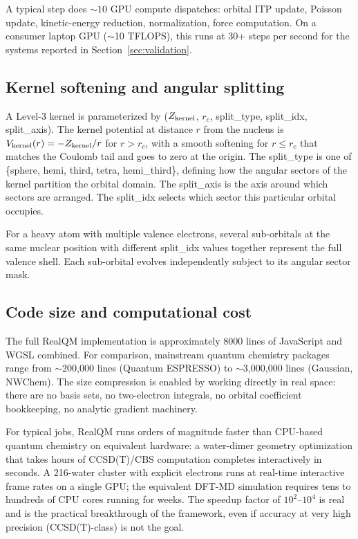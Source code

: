 \documentclass[11pt]{article}
\begin{document}
A typical step does ${\sim}10$ GPU compute dispatches: orbital ITP update, Poisson update, kinetic-energy reduction, normalization, force computation. On a consumer laptop GPU ($\sim$10 TFLOPS), this runs at 30+ steps per second for the systems reported in Section~\ref{sec:validation}.

\subsection{Kernel softening and angular splitting}

A Level-3 kernel is parameterized by ($Z_{\rm kernel}$, $r_c$, split\_type, split\_idx, split\_axis). The kernel potential at distance $r$ from the nucleus is $V_{\rm kernel}(r) = -Z_{\rm kernel}/r$ for $r > r_c$, with a smooth softening for $r \leq r_c$ that matches the Coulomb tail and goes to zero at the origin. The split\_type is one of \{sphere, hemi, third, tetra, hemi\_third\}, defining how the angular sectors of the kernel partition the orbital domain. The split\_axis is the axis around which sectors are arranged. The split\_idx selects which sector this particular orbital occupies.

For a heavy atom with multiple valence electrons, several sub-orbitals at the same nuclear position with different split\_idx values together represent the full valence shell. Each sub-orbital evolves independently subject to its angular sector mask.

\subsection{Code size and computational cost}

The full RealQM implementation is approximately 8000 lines of JavaScript and WGSL combined. For comparison, mainstream quantum chemistry packages range from $\sim$200,000 lines (Quantum ESPRESSO) to $\sim$3,000,000 lines (Gaussian, NWChem). The size compression is enabled by working directly in real space: there are no basis sets, no two-electron integrals, no orbital coefficient bookkeeping, no analytic gradient machinery.

For typical jobs, RealQM runs orders of magnitude faster than CPU-based quantum chemistry on equivalent hardware: a water-dimer geometry optimization that takes hours of CCSD(T)/CBS computation completes interactively in seconds. A 216-water cluster with explicit electrons runs at real-time interactive frame rates on a single GPU; the equivalent DFT-MD simulation requires tens to hundreds of CPU cores running for weeks. The speedup factor of $10^2$--$10^4$ is real and is the practical breakthrough of the framework, even if accuracy at very high precision (CCSD(T)-class) is not the goal.
\end{document}
